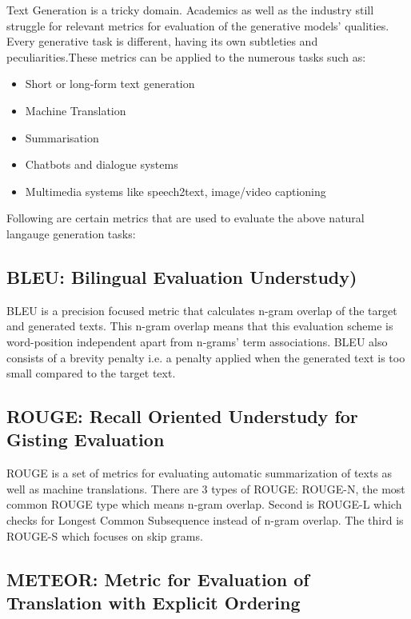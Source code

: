 
Text Generation is a tricky domain. Academics as well as the industry still struggle for relevant metrics for evaluation of the generative models' qualities. Every generative task is different, having its own subtleties and peculiarities.These metrics can be applied to the numerous tasks such as:
\begin{itemize}
	\item Short or long-form text generation
	\item Machine Translation
	\item Summarisation
	\item Chatbots and dialogue systems
	\item Multimedia systems like speech2text, image/video captioning
\end{itemize}
Following are certain metrics that are used to evaluate the above natural langauge generation tasks:

\subsection{BLEU: Bilingual Evaluation Understudy)}

\par BLEU \cite{bleu} is a precision focused metric that calculates n-gram overlap of the target and generated texts. This n-gram overlap means that this evaluation scheme is word-position independent apart from n-grams' term associations. BLEU also consists of a brevity penalty i.e. a penalty applied when the generated text is too small compared to the target text.


\subsection{ROUGE: Recall Oriented Understudy for Gisting Evaluation}

\par ROUGE \cite{rouge} is a set of metrics for evaluating automatic summarization of texts as well as machine translations. There are 3 types of ROUGE: ROUGE-N, the most common ROUGE type which means n-gram overlap. Second is ROUGE-L which checks for Longest Common Subsequence instead of n-gram overlap. The third is ROUGE-S which focuses on skip grams.


\subsection{METEOR: Metric for Evaluation of Translation with Explicit Ordering}

